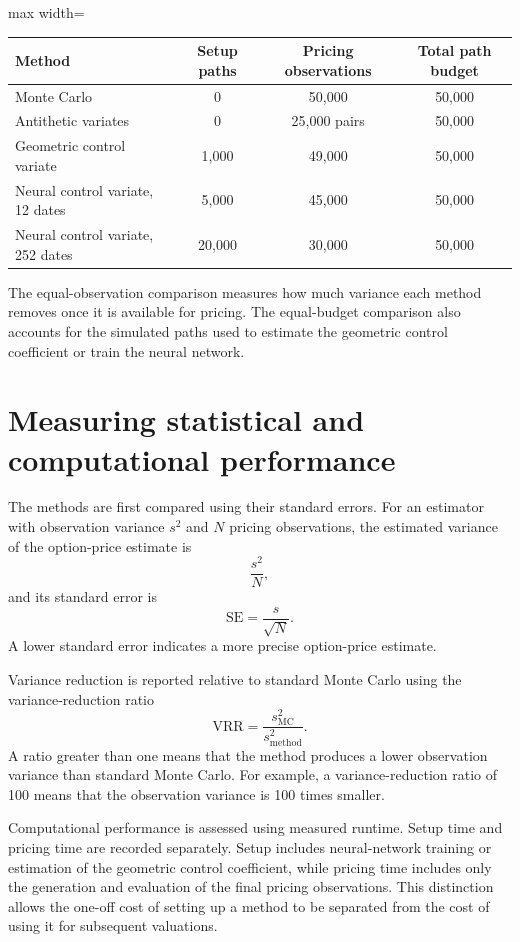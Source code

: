 \begin{table}[h]
\centering
\begin{adjustbox}{max width=\textwidth}
\begin{tabular}{lccc}
\hline
Method & Setup paths & Pricing observations & Total path budget \\
\hline
Monte Carlo & 0 & 50,000 & 50,000 \\
Antithetic variates & 0 & 25,000 pairs & 50,000 \\
Geometric control variate & 1,000 & 49,000 & 50,000 \\
Neural control variate, 12 dates & 5,000 & 45,000 & 50,000 \\
Neural control variate, 252 dates & 20,000 & 30,000 & 50,000 \\
\hline
\end{tabular}
\end{adjustbox}
\end{table}

The equal-observation comparison measures how much variance each method removes once it is available for pricing. The equal-budget comparison also accounts for the simulated paths used to estimate the geometric control coefficient or train the neural network.

\section{Measuring statistical and computational performance}

The methods are first compared using their standard errors. For an estimator with observation variance $s^2$ and $N$ pricing observations, the estimated variance of the option-price estimate is
\[
\frac{s^2}{N},
\]
and its standard error is
\[
\mathrm{SE}=\frac{s}{\sqrt{N}}.
\]
A lower standard error indicates a more precise option-price estimate.

Variance reduction is reported relative to standard Monte Carlo using the variance-reduction ratio
\[
\mathrm{VRR}
=
\frac{s_{\mathrm{MC}}^2}{s_{\mathrm{method}}^2}.
\]
A ratio greater than one means that the method produces a lower observation variance than standard Monte Carlo. For example, a variance-reduction ratio of 100 means that the observation variance is 100 times smaller.

Computational performance is assessed using measured runtime. Setup time and pricing time are recorded separately. Setup includes neural-network training or estimation of the geometric control coefficient, while pricing time includes only the generation and evaluation of the final pricing observations. This distinction allows the one-off cost of setting up a method to be separated from the cost of using it for subsequent valuations.

